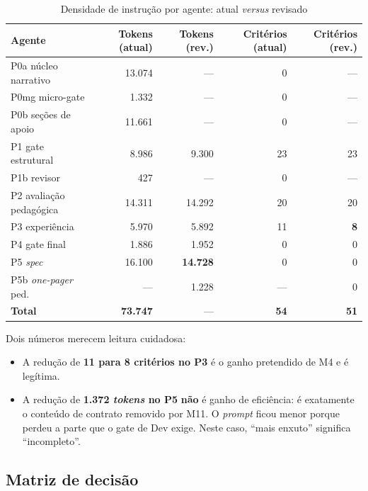 \documentclass[11pt,a4paper]{article}
\begin{document}
\begin{table}[h]
\centering
\caption{Densidade de instrução por agente: atual \textit{versus} revisado}
\label{tab:densidade}
\begin{tabular}{lrrrr}
\toprule
\textbf{Agente} & \textbf{Tokens (atual)} & \textbf{Tokens (rev.)} & \textbf{Critérios (atual)} & \textbf{Critérios (rev.)} \\
\midrule
P0a núcleo narrativo   & 13.074 & --- & 0 & --- \\
P0mg micro-gate        &  1.332 & --- & 0 & --- \\
P0b seções de apoio    & 11.661 & --- & 0 & --- \\
P1 gate estrutural     &  8.986 &  9.300 & 23 & 23 \\
P1b revisor            &    427 & --- & 0 & --- \\
P2 avaliação pedagógica& 14.311 & 14.292 & 20 & 20 \\
P3 experiência         &  5.970 &  5.892 & 11 & \textbf{8} \\
P4 gate final          &  1.886 &  1.952 & 0 & 0 \\
P5 \textit{spec}       & 16.100 & \textbf{14.728} & 0 & 0 \\
P5b \textit{one-pager} ped. & --- & 1.228 & --- & 0 \\
\midrule
\textbf{Total}         & \textbf{73.747} & --- & \textbf{54} & \textbf{51} \\
\bottomrule
\end{tabular}
\end{table}

\noindent
Dois números merecem leitura cuidadosa:

\begin{itemize}[leftmargin=*]
  \item A redução de \textbf{11 para 8 critérios no P3} é o ganho pretendido de M4 e é legítima.
  \item A redução de \textbf{1.372 \textit{tokens} no P5} \textbf{não} é ganho de eficiência: é exatamente o
  conteúdo de contrato removido por M11. O \textit{prompt} ficou menor porque perdeu a parte que o gate de
  Dev exige. Neste caso, ``mais enxuto'' significa ``incompleto''.
\end{itemize}

\subsection{Matriz de decisão}
\end{document}
